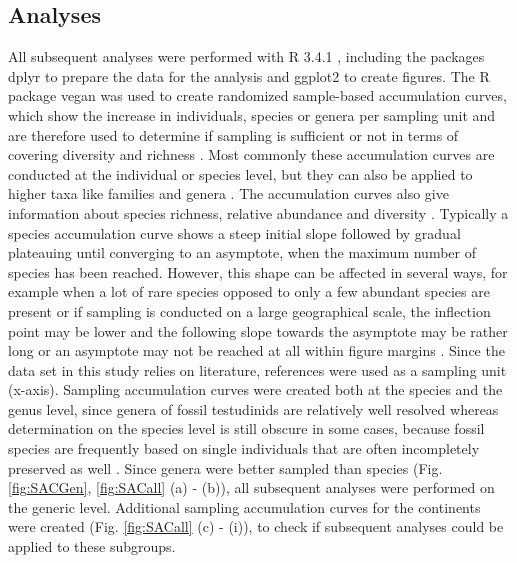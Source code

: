\subsection{Analyses}
All subsequent analyses were performed with R 3.4.1 \citep{RCoreTeam2017}, including the packages dplyr \citep{Wickham2017} to prepare the data for the analysis and ggplot2 \citep{Wickham2009} to create figures. The R package vegan \citep{Oksanen2017} was used to create randomized sample-based accumulation curves, which show the increase in individuals, species or genera per sampling unit and are therefore used to determine if sampling is sufficient or not in terms of covering diversity and richness \citep{Thompson2002}. Most commonly these accumulation curves are conducted at the individual or species level, but they can also be applied to higher taxa like families and genera \citep{Gotelli2011, Gotelli2001}. The accumulation curves also give information about species richness, relative abundance and diversity \citep{Thompson2002}. Typically a species accumulation curve shows a steep initial slope followed by gradual plateauing until converging to an asymptote, when the maximum number of species has been reached. However, this shape can be affected in several ways, for example when a lot of rare species opposed to only a few abundant species are present or if sampling is conducted on a large geographical scale, the inflection point may be lower and the following slope towards the asymptote may be rather long or an asymptote may not be reached at all within figure margins \citep{Gotelli2011, Gotelli2001}. 
Since the data set in this study relies on literature, references were used as a sampling unit (x-axis). %
Sampling accumulation curves were created both at the species and the genus level, since genera of fossil testudinids are relatively well resolved whereas determination on the species level is still obscure in some cases, because fossil species are frequently based on single individuals that are often incompletely preserved as well \citep{Brattstrom1961, DeLapparentdeBroin2001}. Since genera were better sampled than species (Fig. \ref{fig:SACGen}, \ref{fig:SACall} (a) - (b)), all subsequent analyses were performed on the generic level.
Additional sampling accumulation curves for the continents were created (Fig. \ref{fig:SACall} (c) -  (i)), to check if subsequent analyses could be applied to these subgroups. 

